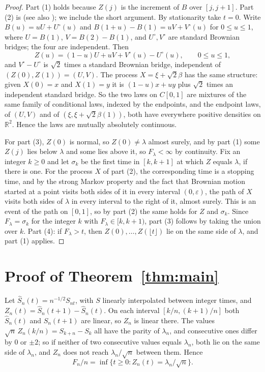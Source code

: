 \documentclass[11pt]{amsart}
\theoremstyle{remark}
\numberwithin{equation}{section}
\newcommand{\R}{\mathbb{R}}
\begin{document}
\begin{proof}
Part (1) holds because $Z(j)$ is the increment of $B$ over $[j,j+1]$. Part (2) is \cite[Lemma~4.3]{PTS} (see also \cite[Lemma~2.5]{PT}); we include the short argument. By stationarity take $t=0$. Write $B(u)=uU+U^\circ(u)$ and $B(1+u)-B(1)=uV+V^\circ(u)$ for $0\le u\le1$, where $U=B(1)$, $V=B(2)-B(1)$, and $U^\circ,V^\circ$ are standard Brownian bridges; the four are independent. Then
\[
Z(u)=(1-u)U+uV+V^\circ(u)-U^\circ(u),\qquad 0\le u\le1,
\]
and $V^\circ-U^\circ$ is $\sqrt2$ times a standard Brownian bridge, independent of $(Z(0),Z(1))=(U,V)$. The process $X=\xi+\sqrt2\beta$ has the same structure: given $X(0)=x$ and $X(1)=y$ it is $(1-u)x+uy$ plus $\sqrt2$ times an independent standard bridge. So the two laws on $C[0,1]$ are mixtures of the same family of conditional laws, indexed by the endpoints, and the endpoint laws, of $(U,V)$ and of $(\xi,\xi+\sqrt2\beta(1))$, both have everywhere positive densities on $\R^2$. Hence the laws are mutually absolutely continuous.

For part (3), $Z(0)$ is normal, so $Z(0)\ne\lambda$ almost surely, and by part (1) some $Z(j)$ lies below $\lambda$ and some lies above it, so $F_\lambda<\infty$ by continuity. Fix an integer $k\ge0$ and let $\sigma_k$ be the first time in $[k,k+1]$ at which $Z$ equals $\lambda$, if there is one. For the process $X$ of part (2), the corresponding time is a stopping time, and by the strong Markov property and the fact that Brownian motion started at a point visits both sides of it in every interval $(0,\varepsilon)$, the path of $X$ visits both sides of $\lambda$ in every interval to the right of it, almost surely. This is an event of the path on $[0,1]$, so by part (2) the same holds for $Z$ and $\sigma_k$. Since $F_\lambda=\sigma_k$ for the integer $k$ with $F_\lambda\in[k,k+1)$, part (3) follows by taking the union over $k$. Part (4): if $F_\lambda>t$, then $Z(0),\dots,Z(\lfloor t\rfloor)$ lie on the same side of $\lambda$, and part (1) applies.
\end{proof}

\section{Proof of Theorem~\ref{thm:main}}\label{sec:proof}

Let $\widehat S_n(t)=n^{-1/2}S_{nt}$, with $S$ linearly interpolated between integer times, and $Z_n(t)=\widehat S_n(t+1)-\widehat S_n(t)$. On each interval $[k/n,(k+1)/n]$ both $\widehat S_n(t)$ and $\widehat S_n(t+1)$ are linear, so $Z_n$ is linear there. The values $\sqrt n\,Z_n(k/n)=S_{k+n}-S_k$ all have the parity of $\lambda_n$, and consecutive ones differ by $0$ or $\pm2$; so if neither of two consecutive values equals $\lambda_n$, both lie on the same side of $\lambda_n$, and $Z_n$ does not reach $\lambda_n/\sqrt n$ between them. Hence
\begin{equation}\label{eq:hit}
F_n/n=\inf\{t\ge0:Z_n(t)=\lambda_n/\sqrt n\}.
\end{equation}
\end{document}
